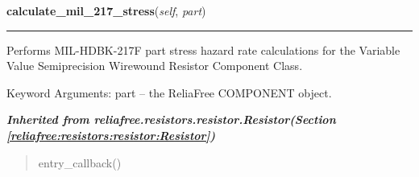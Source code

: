     \label{reliafree:resistors:variable:WirewoundSemiPrecision:calculate_mil_217_stress}

    \vspace{0.5ex}

\hspace{.8\funcindent}\begin{boxedminipage}{\funcwidth}

    \raggedright \textbf{calculate\_mil\_217\_stress}(\textit{self}, \textit{part})

    \vspace{-1.5ex}

    \rule{\textwidth}{0.5\fboxrule}
\setlength{\parskip}{2ex}
    Performs MIL-HDBK-217F part stress hazard rate calculations for the 
    Variable Value Semiprecision Wirewound Resistor Component Class.

    Keyword Arguments: part -- the ReliaFree COMPONENT object.

\setlength{\parskip}{1ex}
    \end{boxedminipage}


\large{\textbf{\textit{Inherited from reliafree.resistors.resistor.Resistor\textit{(Section \ref{reliafree:resistors:resistor:Resistor})}}}}

\begin{quote}
entry\_callback()
\end{quote}
